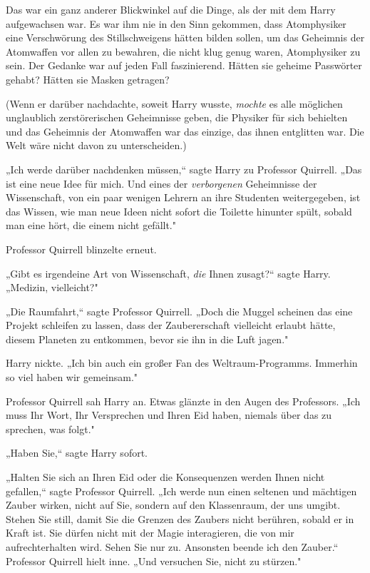 {Das war ein ganz anderer Blickwinkel auf die Dinge, als der mit dem Harry aufgewachsen war. Es war ihm nie in den Sinn gekommen, dass Atomphysiker eine Verschwörung des Stillschweigens hätten bilden sollen, um das Geheimnis der Atomwaffen vor allen zu bewahren, die nicht klug genug waren, Atomphysiker zu sein. Der Gedanke war auf jeden Fall faszinierend. Hätten sie geheime Passwörter gehabt? Hätten sie Masken getragen?

(Wenn er darüber nachdachte, soweit Harry wusste, \emph{mochte} es alle möglichen unglaublich zerstörerischen Geheimnisse geben, die Physiker für sich behielten und das Geheimnis der Atomwaffen war das einzige, das ihnen entglitten war. Die Welt wäre nicht davon zu unterscheiden.)

„Ich werde darüber nachdenken müssen,“ sagte Harry zu Professor Quirrell. „Das ist eine neue Idee für mich. Und eines der \emph{verborgenen} Geheimnisse der Wissenschaft, von ein paar wenigen Lehrern an ihre Studenten weitergegeben, ist das Wissen, wie man neue Ideen nicht sofort die Toilette hinunter spült, sobald man eine hört, die einem nicht gefällt."

Professor Quirrell blinzelte erneut.

„Gibt es irgendeine Art von Wissenschaft, \emph{die} Ihnen zusagt?“ sagte Harry. „Medizin, vielleicht?"

„Die Raumfahrt,“ sagte Professor Quirrell. „Doch die Muggel scheinen das eine Projekt schleifen zu lassen, dass der Zaubererschaft vielleicht erlaubt hätte, diesem Planeten zu entkommen, bevor sie ihn in die Luft jagen."

Harry nickte. „Ich bin auch ein großer Fan des Weltraum-Programms. Immerhin so viel haben wir gemeinsam."

Professor Quirrell sah Harry an. Etwas glänzte in den Augen des Professors. „Ich muss Ihr Wort, Ihr Versprechen und Ihren Eid haben, niemals über das zu sprechen, was folgt."

„Haben Sie,“ sagte Harry sofort.

„Halten Sie sich an Ihren Eid oder die Konsequenzen werden Ihnen nicht gefallen,“ sagte Professor Quirrell. „Ich werde nun einen seltenen und mächtigen Zauber wirken, nicht auf Sie, sondern auf den Klassenraum, der uns umgibt. Stehen Sie still, damit Sie die Grenzen des Zaubers nicht berühren, sobald er in Kraft ist. Sie dürfen nicht mit der Magie interagieren, die von mir aufrechterhalten wird. Sehen Sie nur zu. Ansonsten beende ich den Zauber.“ Professor Quirrell hielt inne. „Und versuchen Sie, nicht zu stürzen."

}
